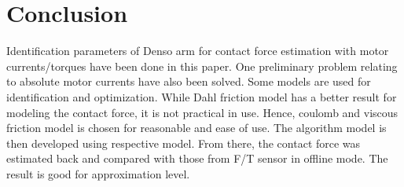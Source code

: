 \documentclass[letterpaper, 10 pt, conference]{ieeeconf}
\begin{document}
      \section{Conclusion}
Identification parameters of Denso arm for contact force estimation with motor currents/torques have been done in this paper. One preliminary problem relating to absolute motor currents have also been solved. Some models are used for identification and optimization. While Dahl friction model has a better result for modeling the contact force, it is not practical in use. Hence, coulomb and viscous friction model is chosen for reasonable and ease of use. The algorithm model is then developed using respective model. From there, the contact force was estimated back and compared with those from F/T sensor in offline mode. The result is good for approximation level. 



\end{document}
